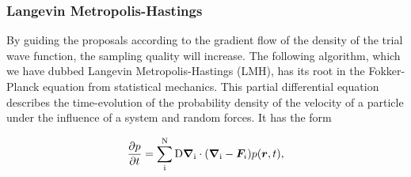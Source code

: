 
\subsubsection{Langevin Metropolis-Hastings}\label{sec:lmh}
By guiding the proposals according to the gradient flow of the density of the trial wave function, the sampling quality will increase. The following algorithm, which we have dubbed Langevin Metropolis-Hastings (LMH), has its root in the Fokker-Planck equation from statistical mechanics. This partial differential equation describes the time-evolution of the probability density of the velocity of a particle under the influence of a system and random forces. It has the form

\begin{equation}\label{eq:fokker-planck}
    \pdv{p}{t} = \sum_{\mathrm{i}}^{\mathrm{N}}\mathrm{D}\grad_{\mathrm{i}}\cdot\qty(\grad_{\mathrm{i}}-\bm{F}_i)p(\bm{r}, t), 
\end{equation}


